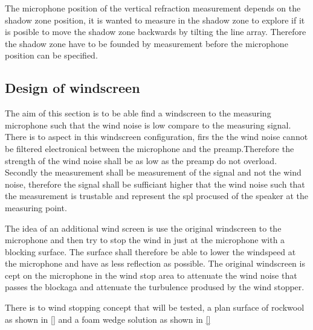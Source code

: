 

The microphone position of the vertical refraction measurement depends on the shadow zone position, it is wanted to measure in the shadow zone to explore if it is posible to move the shadow zone backwards by tilting the line array. Therefore the shadow zone have to be founded by measurement before the microphone position can be specified.


\subsection{Design of windscreen}
The aim of this section is to be able find a windscreen to the measuring microphone such that the wind noise is low compare to the measuring signal. There is to aspect in this windscreen configuration, firs the the wind noise cannot be filtered electronical between the microphone and the preamp.Therefore the strength of the wind noise shall be as low as the preamp do not overload. Secondly the measurement shall be measurement of the signal and not the wind noise, therefore the signal shall be sufficiant higher that the wind noise such that the measurement is trustable and represent the \gls{spl} procused of the speaker at the measuring point. 

The idea of an additional wind screen is use the original windscreen to the microphone and then try to stop the wind in just at the microphone with a blocking surface. The surface shall therefore be able to lower the windspeed at the microphone and have as less reflection as possible. The original windscreen is cept on the microphone in the wind stop area to attenuate the wind noise that passes the blockaga and attenuate the turbulence prodused by the wind stopper. 

There is to wind stopping concept that will be tested, a plan surface of rockwool as shown in \autoref{} and a foam wedge solution as shown in \autoref{}
    


